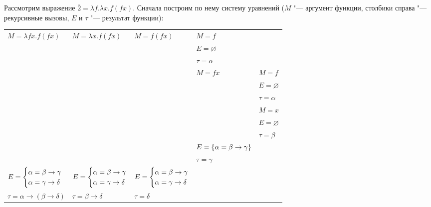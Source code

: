 \begin{example}
    Рассмотрим выражение $\overline 2 = \lambda f . \lambda x . f (f x)$. Сначала построим по нему систему уравнений
    ($M$ "--- аргумент функции, столбики справа "--- рекурсивные вызовы, $E$ и $\tau$ "--- результат функции):
    \begin{center}
        \begin{tabular}{l l l l l} \toprule
            $M = \lambda f x . f (f x)$ & $M = \lambda x . f (f x)$ & $M = f (f x)$ & $M = f$ & \\
            & & & $E = \varnothing$ & \\
            & & & $\tau = \alpha$ \\ \cmidrule{4-5}
            & & & $M = f x$ & $M = f$ \\
            & & & & $E = \varnothing$ \\
            & & & & $\tau = \alpha$ \\ \cmidrule{5-5}
            & & & & $M = x$ \\
            & & & & $E = \varnothing$ \\
            & & & & $\tau = \beta$ \\ \cmidrule{5-5}
            & & & $E = \left\{\alpha = \beta \rightarrow \gamma\right\}$ & \\
            & & & $\tau = \gamma$ & \\ \cmidrule{4-5}
            $E = \begin{cases}
              \alpha=\beta\rightarrow\gamma \\
              \alpha=\gamma\rightarrow\delta
            \end{cases}\mkern-18mu$ &
            $E = \begin{cases}
                \alpha=\beta\rightarrow\gamma \\
                \alpha=\gamma\rightarrow\delta
            \end{cases}\mkern-18mu$ &
            $E = \begin{cases}
                \alpha=\beta\rightarrow\gamma \\
                \alpha=\gamma\rightarrow\delta
            \end{cases}\mkern-18mu$ & & \\[1.2em]
            $\tau = \alpha\rightarrow(\beta\rightarrow\delta)$ &
            $\tau = \beta\rightarrow\delta$ &
            $\tau = \delta$ & & \\ \bottomrule
        \end{tabular}

\end{center}
\end{example}
